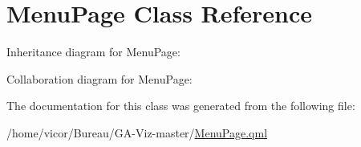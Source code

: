 \hypertarget{class_menu_page}{}\section{Menu\+Page Class Reference}
\label{class_menu_page}


Inheritance diagram for Menu\+Page\+:


Collaboration diagram for Menu\+Page\+:


The documentation for this class was generated from the following file\+:\begin{DoxyCompactItemize}
\item 
/home/vicor/\+Bureau/\+G\+A-\/\+Viz-\/master/\hyperlink{_menu_page_8qml}{Menu\+Page.\+qml}\end{DoxyCompactItemize}
